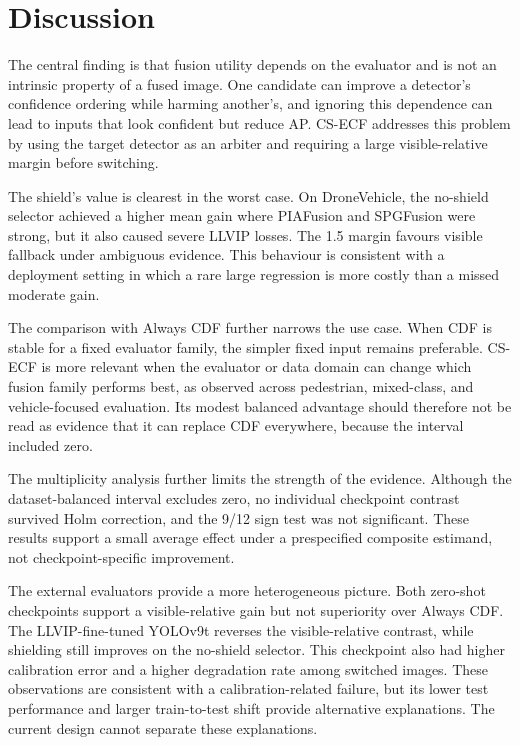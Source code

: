 \documentclass[preprint,11pt]{elsarticle}
\begin{document}
\section{Discussion}

The central finding is that fusion utility depends on the evaluator and is not
an intrinsic property of a fused image. One candidate can improve a detector's
confidence ordering while harming another's, and ignoring this dependence can
lead to inputs that look confident but reduce AP. CS-ECF addresses this problem
by using the target detector as an arbiter and requiring a large
visible-relative margin before switching.

The shield's value is clearest in the worst case. On DroneVehicle, the
no-shield selector achieved a higher mean gain where PIAFusion and SPGFusion
were strong, but it also caused severe LLVIP losses. The 1.5 margin favours
visible fallback under ambiguous evidence. This behaviour is consistent with a
deployment setting in which a rare large regression is more costly than a
missed moderate gain.

The comparison with Always CDF further narrows the use case. When CDF is stable
for a fixed evaluator family, the simpler fixed input remains preferable.
CS-ECF is more relevant when the evaluator or data domain can change which
fusion family performs best, as observed across pedestrian, mixed-class, and
vehicle-focused evaluation. Its modest balanced advantage should therefore not
be read as evidence that it can replace CDF everywhere, because the interval
included zero.

The multiplicity analysis further limits the strength of the evidence.
Although the dataset-balanced interval excludes zero, no individual checkpoint
contrast survived Holm correction, and the 9/12 sign test was not significant.
These results support a small average effect under a prespecified composite
estimand, not checkpoint-specific improvement.

The external evaluators provide a more heterogeneous picture. Both zero-shot
checkpoints support a visible-relative gain but not superiority over Always
CDF. The LLVIP-fine-tuned YOLOv9t reverses the visible-relative contrast, while
shielding still improves on the no-shield selector. This checkpoint also had
higher calibration error and a higher degradation rate among switched images.
These observations are consistent with a calibration-related failure, but its
lower test performance and larger train-to-test shift provide alternative
explanations. The current design cannot separate these explanations.
\end{document}
